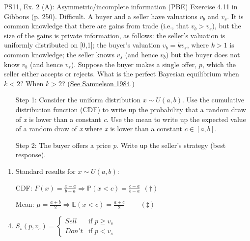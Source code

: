 \begin{frame}{PS11, Ex. 2 (A): Asymmetric/incomplete information (PBE)}
    Exercise 4.11 in Gibbons (p. 250). Difficult. A buyer and a seller have valuations $v_b$ and $v_s$. It is common knowledge that there are gains from trade (i.e., that $v_b > v_s$), but the size of the gains is private information, as follows: the seller’s valuation is uniformly distributed on [0,1]; the buyer’s valuation $v_b = kv_s$, where $k > 1$ is common knowledge; the seller knows $v_s$ (and hence $v_b$) but the buyer does not know $v_b$ (and hence $v_s$). Suppose the buyer makes a single offer, $p$, which the seller either accepts or rejects. What is the perfect Bayesian equilibrium when $k < 2$? When $k > 2$? (\href{https://www.jstor.org/stable/1911195}{See Samuelson 1984}.) \vspace{-8pt}
    \begin{multicols}{2}
      \begin{itemize}
        \item[Step 1:] Consider the uniform distribution $x\sim U(a, b)$. Use the cumulative distribution function (CDF) to write up the probability that a random draw of \textit{x} is lower than a constant \textit{c}. Use the mean to write up the expected value of a random draw of \textit{x} where \textit{x} is lower than a constant $c\in[a,b]$.
        \item[Step 2:] The buyer offers a price \textit{p}. Write up the seller's strategy (best response).
      \end{itemize}
      \vfill\null\columnbreak
      \begin{enumerate}
        \item Standard results for $x\sim U(a, b):$
        \item[CDF:] $F(x)=\frac{x-a}{b-a}\Rightarrow\mathbb{P}(x<c)=\frac{c-a}{b-a}\ \ (\dagger)$
        \item[Mean:] $\mu=\frac{a+b}{2}\Rightarrow\mathbb{E}(x<c)=\frac{a+c}{2}\quad\quad\ (\ddagger)$
        \item $S_s(p,v_s)=\left\{\begin{array}{ll}
          Sell  & \text{if }p\geq v_s \\
          Don't & \text{if }p < v_s
        \end{array}\right.$
      \end{enumerate}
      \vfill\null
    \end{multicols}
\end{frame}
